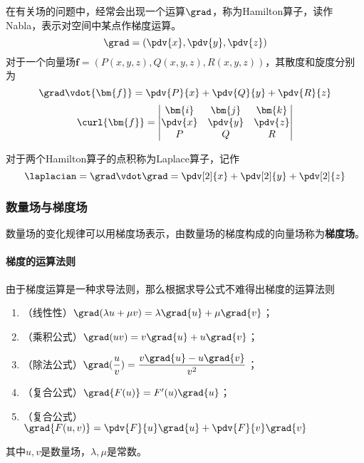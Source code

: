 在有关场的问题中，经常会出现一个运算$\grad$，称为Hamilton算子，读作Nabla，表示对空间中某点作梯度运算。
\[ \grad = \left(\pdv{x},\pdv{y},\pdv{z}\right) \]
对于一个向量场$\bm{f}=(P(x,y,z),Q(x,y,z),R(x,y,z))$，其散度和旋度分别为
\[ \grad\vdot{\bm{f}} = \pdv{P}{x} + \pdv{Q}{y} + \pdv{R}{z} \]
\[
    \curl{\bm{f}} =
    \begin{vmatrix}
        \bm{i}  & \bm{j}  & \bm{k}  \\
        \pdv{x} & \pdv{y} & \pdv{z} \\
        P       & Q       & R
    \end{vmatrix}
\]

对于两个Hamilton算子的点积称为Laplace算子，记作
\[ \laplacian = \grad \vdot \grad = \pdv[2]{x} + \pdv[2]{y} + \pdv[2]{z} \]

\subsubsection{数量场与梯度场}
数量场的变化规律可以用梯度场表示，由数量场的梯度构成的向量场称为\textbf{\textsf{梯度场}}。

\paragraph{梯度的运算法则}
由于梯度运算是一种求导法则，那么根据求导公式不难得出梯度的运算法则
\begin{enumerate}[(1)]
    \item （线性性）$\grad(\lambda u + \mu v) = \lambda\grad{u} + \mu\grad{v}$；
    \item （乘积公式）$\grad(uv) = v\grad{u} + u\grad{v}$；
    \item （除法公式）$\grad(\dfrac{u}{v}) = \dfrac{v\grad{u}-u\grad{v}}{v^2}$；
    \item （复合公式）$\grad{F(u)} = F'(u)\grad{u}$；
    \item （复合公式）$\grad{F(u,v)} = \pdv{F}{u}\grad{u} + \pdv{F}{v}\grad{v}$
\end{enumerate}
其中$u,v$是数量场，$\lambda,\mu$是常数。

